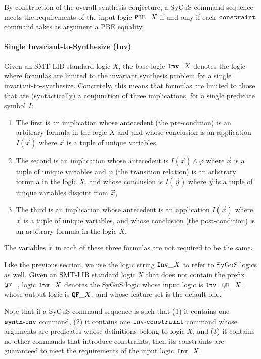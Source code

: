 \documentclass[english,a4paper,10pt]{article}
\begin{document}
By construction of the overall synthesis conjecture, a SyGuS command sequence
meets the requirements of the input logic ${\tt PBE\_}X$
if and only if each ${\tt constraint}$ command takes as argument a PBE equality.

\paragraph{Single Invariant-to-Synthesize (Inv)}
Given an SMT-LIB standard logic $X$,
the base logic ${\tt Inv\_}X$ denotes the logic
where formulas are limited to the invariant synthesis
problem for a single invariant-to-synthesize.
Concretely,
this means that formulas are limited to those that 
are (syntactically) a conjunction of three implications, 
for a single predicate symbol $I$:
\begin{enumerate}
\item The first is an implication whose antecedent (the pre-condition) 
is an arbitrary formula
in the logic $X$ and
and whose conclusion is
an application $I( \vec x )$ where $\vec x$ is a tuple of unique variables,

\item The second is an implication whose antecedent is
$I( \vec x ) \wedge \varphi$
where $\vec x$ is a tuple of unique variables and $\varphi$ (the transition relation) 
is an arbitrary formula
in the logic $X$,
and whose conclusion is $I( \vec y )$
where $\vec y$ is a tuple of unique variables disjoint from $\vec x$,

\item The third is an implication whose antecedent is 
an application $I( \vec x )$ where $\vec x$ is a tuple of unique variables,
and whose conclusion (the post-condition) is an arbitrary formula in the logic $X$.
\end{enumerate}
The variables $\vec x$ in each of these three formulas are not required to be the same.

Like the previous section, 
we use the logic string ${\tt Inv\_}X$ to refer to SyGuS logics as well.
Given an SMT-LIB standard logic $X$
that does not contain the prefix ${\tt QF\_}$,
logic ${\tt Inv\_}X$ denotes the SyGuS logic
whose input logic is ${\tt Inv\_QF\_}X$,
whose output logic is ${\tt QF\_}X$,
and whose feature set is the default one.

Note that if a SyGuS command sequence is such that
(1) it contains one ${\tt synth\mbox{-}inv}$ command,
(2) it contains one ${\tt inv\mbox{-}constraint}$ command whose arguments are predicates whose definitions belong to logic $X$,
and (3) it contains no other commands that introduce constraints,
then its constraints are guaranteed to meet the requirements of the input logic ${\tt Inv\_}X$.
\end{document}
